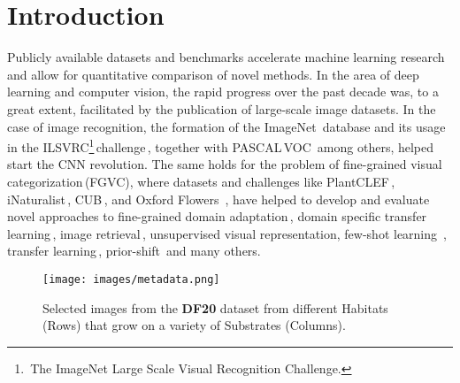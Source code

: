 \documentclass[10pt,twocolumn,letterpaper]{article}
\begin{document}
\section{Introduction}
Publicly available datasets and benchmarks accelerate machine learning research and allow for quantitative comparison of novel methods. In the area of deep learning and computer vision, the rapid progress over the past decade was, to a great extent, facilitated by the publication of large-scale image datasets. In the case of image recognition, the formation of the ImageNet\,\cite{imagenet} database and its usage in the ILSVRC\footnote{\,The ImageNet Large Scale Visual Recognition Challenge.}\,challenge\,\cite{ILSVRC15}, together with PASCAL\,VOC\,\cite{voc} among others, helped start the CNN revolution. The same holds for the problem of fine-grained visual categorization\,(FGVC), where datasets and challenges like PlantCLEF\,\cite{plantclef2016, plantclef2017, plantclef2015}, iNaturalist\,\cite{inaturalist2017}, CUB\,\cite{dataset-CUBS}, and Oxford Flowers \,\cite{dataset-flower}, have helped to develop and evaluate novel approaches to fine-grained domain adaptation\,\cite{domain_adap}, domain specific transfer learning\,\cite{transfer_learning}, image retrieval\,\cite{ft_imagenet_3, sohn2016improved, zhai2019classification}, unsupervised visual representation, few-shot learning \,\cite{wertheimer2019few}, transfer learning\,\cite{transfer_learning}, prior-shift\,\cite{sulc2018improving} and many others.

\begin{figure}[t!]
\begin{center}
\vspace{0.4cm}
\texttt{[image: images/metadata.png]}
\caption{Selected images from the \textbf{DF20} dataset from different Habitats (Rows) that grow on a variety of Substrates (Columns).}
\label{fig:genus_metadata}
\vspace{-0.5cm}
\end{center}
\end{figure}
\end{document}
